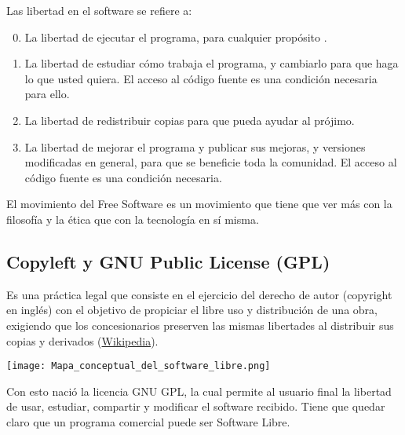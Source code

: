 Las libertad en el software se refiere a:
\begin{tcolorbox}[title=Libertades del Software Libre:]
    \begin{enumerate}
        \setcounter{enumi}{-1}
        \item La libertad de ejecutar el programa, para cualquier propósito .

        \item La libertad de estudiar cómo trabaja el programa, y cambiarlo para que haga lo que usted quiera. El acceso al código fuente es una condición necesaria para ello.

        \item La libertad de redistribuir copias para que pueda ayudar al prójimo.

        \item La libertad de mejorar el programa y publicar sus mejoras, y versiones modificadas en general, para que se beneficie toda la comunidad. El acceso al código fuente es una condición necesaria.
    \end{enumerate}
\end{tcolorbox}

El movimiento del Free Software es un movimiento que tiene que ver más con la filosofía y la ética que con la tecnología en sí misma.


\subsection{Copyleft y GNU Public License (GPL)}
Es una práctica legal que consiste en el ejercicio del derecho de autor (copyright en inglés) con el objetivo de propiciar el libre uso y distribución de una obra, exigiendo que los concesionarios preserven las mismas libertades al distribuir sus copias y derivados (\href{https://es.wikipedia.org/wiki/Copyleft}{Wikipedia}).

\begin{center}
  \texttt{[image: Mapa\_conceptual\_del\_software\_libre.png]}
  \vspace{-30pt}\vspace{-20pt}
\end{center}

Con esto nació la licencia GNU GPL, la cual permite al usuario final la libertad de usar, estudiar, compartir y modificar el software recibido. Tiene que quedar claro que un programa comercial puede ser Software Libre.

